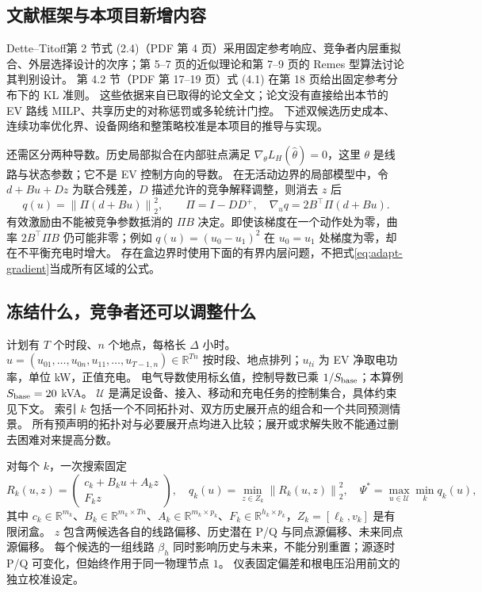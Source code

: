\documentclass[UTF8,fontset=fandol,11pt,a4paper]{ctexart}
\newcommand{\R}{\mathbb R}
\newcommand{\norm}[1]{\left\lVert#1\right\rVert}
\begin{document}
\subsection{文献框架与本项目新增内容}
Dette--Titoff\cite{dette}第 2 节式 (2.4)（PDF 第 4 页）采用固定参考响应、竞争者内层重拟合、外层选择设计的次序；第 5--7 页的近似理论和第 7--9 页的 Remes 型算法讨论其判别设计。
第 4.2 节（PDF 第 17--19 页）式 (4.1) 在第 18 页给出固定参考分布下的 KL 准则。
这些依据来自已取得的论文全文；论文没有直接给出本节的 EV 路线 MILP、共享历史的对称惩罚或多轮统计门控。
下述双候选历史成本、连续功率优化界、设备网络和整策略校准是本项目的推导与实现。

还需区分两种导数。历史局部拟合在内部驻点满足 $\nabla_\theta L_H(\widehat\theta)=0$，这里 $\theta$ 是线路与状态参数；它不是 EV 控制方向的导数。
在无活动边界的局部模型中，令 $d+Bu+Dz$ 为联合残差，$D$ 描述允许的竞争解释调整，则消去 $z$ 后
\begin{equation}
 q(u)=\norm{\Pi(d+Bu)}_2^2,\qquad
 \Pi=I-DD^+,
 \quad \nabla_uq=2B^\top\Pi(d+Bu).
 \label{eq:adapt-gradient}
\end{equation}
有效激励由不能被竞争参数抵消的 $\Pi B$ 决定。即使该梯度在一个动作处为零，曲率 $2B^\top\Pi B$ 仍可能非零；例如 $q(u)=(u_0-u_1)^2$ 在 $u_0=u_1$ 处梯度为零，却在不平衡充电时增大。
存在盒边界时使用下面的有界内层问题，不把式\eqref{eq:adapt-gradient}当成所有区域的公式。

\subsection{冻结什么，竞争者还可以调整什么}
计划有 $T$ 个时段、$n$ 个地点，每格长 $\Delta$ 小时。
$u=(u_{01},\ldots,u_{0n},u_{11},\ldots,u_{T-1,n})\in\R^{Tn}$ 按时段、地点排列；$u_{ti}$ 为 EV 净取电功率，单位 kW，正值充电。
电气导数使用标幺值，控制导数已乘 $1/S_{\rm base}$；本算例 $S_{\rm base}=20$ kVA。
$\mathcal U$ 是满足设备、接入、移动和充电任务的控制集合，具体约束见下文。
索引 $k$ 包括一个不同拓扑对、双方历史展开点的组合和一个共同预测情景。
所有预声明的拓扑对与必要展开点均进入比较；展开或求解失败不能通过删去困难对来提高分数。

对每个 $k$，一次搜索固定
\begin{equation}
 R_k(u,z)=\begin{pmatrix}c_k+B_ku+A_kz\\F_kz\end{pmatrix},\quad
 q_k(u)=\min_{z\in Z_k}\norm{R_k(u,z)}_2^2,\quad
 \Psi^*=\max_{u\in\mathcal U}\min_kq_k(u),
 \label{eq:adapt-proxy}
\end{equation}
其中 $c_k\in\R^{m_k}$、$B_k\in\R^{m_k\times Tn}$、$A_k\in\R^{m_k\times p_k}$、$F_k\in\R^{h_k\times p_k}$，$Z_k=[\ell_k,v_k]$ 是有限闭盒。
$z$ 包含两候选各自的线路偏移、历史潜在 P/Q 与同点源偏移、未来同点源偏移。
每个候选的一组线路 $\beta_h$ 同时影响历史与未来，不能分别重置；源逐时 P/Q 可变化，但始终作用于同一物理节点 $1$。
仪表固定偏差和根电压沿用前文的独立校准设定。
\end{document}
